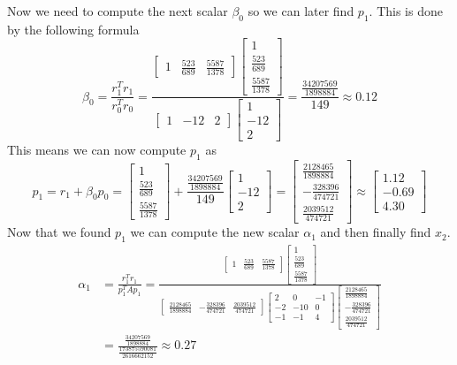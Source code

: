 \documentclass[12pt]{article}
\begin{document}
Now we need to compute the next scalar $\beta_0$ so we can later find $p_1$. This is done by the following formula
$$
\beta_0=\frac{r_1^Tr_1}{r_0^Tr_0}
=
\frac{
\begin{bmatrix}
1 & \frac{523}{689} & \frac{5587}{1378}
\end{bmatrix}
\begin{bmatrix}
1 \\
\frac{523}{689} \\
\frac{5587}{1378}
\end{bmatrix}}{
\begin{bmatrix}
1 & -12 & 2
\end{bmatrix}
\begin{bmatrix}
1 \\
-12 \\
2
\end{bmatrix}}
=
\frac{\frac{34207569}{1898884}}{149}
\approx
0.12
$$
This means we can now compute $p_1$ as
$$
p_1=r_1+\beta_0p_0=
\begin{bmatrix}
1 \\
\frac{523}{689} \\
\frac{5587}{1378}
\end{bmatrix}
+
\frac{\frac{34207569}{1898884}}{149}
\begin{bmatrix}
1 \\
-12 \\
2
\end{bmatrix}
=
\begin{bmatrix}
\frac{2128465}{1898884} \\
-\frac{328396}{474721} \\
\frac{2039512}{474721}
\end{bmatrix}
\approx
\begin{bmatrix}
1.12 \\
-0.69 \\
4.30
\end{bmatrix}
$$
Now that we found $p_1$ we can compute the new scalar $\alpha_1$ and then finally find $x_2$.
\begin{align*}
\alpha_1
&=
\frac{r_1^Tr_1}{p_1^TAp_1}
=
\frac{
\begin{bmatrix}
1 & \frac{523}{689} & \frac{5587}{1378}
\end{bmatrix}
\begin{bmatrix}
1 \\
\frac{523}{689} \\
\frac{5587}{1378}
\end{bmatrix}}{
\begin{bmatrix}
\frac{2128465}{1898884} & -\frac{328396}{474721} & \frac{2039512}{474721}
\end{bmatrix}
\begin{bmatrix}
2 & 0 & -1 \\
-2 & -10 & 0 \\
-1 & -1 & 4
\end{bmatrix}  
\begin{bmatrix}
\frac{2128465}{1898884} \\
-\frac{328396}{474721} \\
\frac{2039512}{474721}
\end{bmatrix}
}\\
&=
\frac{\frac{34207569}{1898884}}{\frac{173875590081}{2616662152}}
\approx
0.27
\end{align*}
\end{document}
